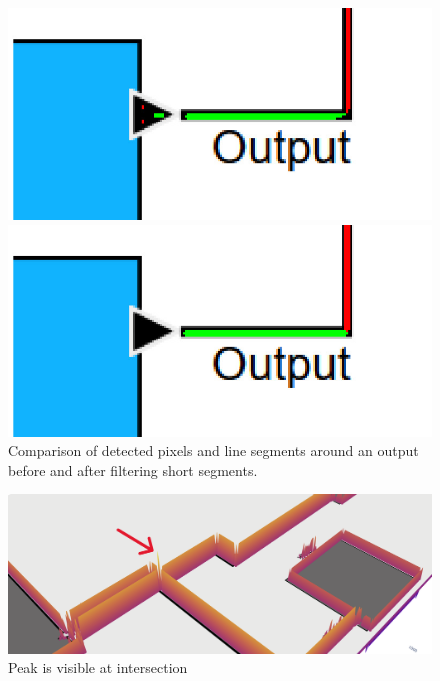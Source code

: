 \begin{figure}[h]
  \centering
  \begin{minipage}[b]{0.45\textwidth}
    \includegraphics[width=\textwidth]{Pictures/thresh_zoom.png}
  \end{minipage}
  \hfill
  \begin{minipage}[b]{0.45\textwidth}
    \includegraphics[width=\textwidth]{Pictures/line_segments_zoom.png}
  \end{minipage}
  \caption{Comparison of detected pixels and line segments around an output before and after filtering short segments.}
  \label{fig_comparison_filter}
\end{figure}
\begin{figure}
    \centering
    \includegraphics[width=1\linewidth]{Pictures/intersection_peak.png}
    \caption{Peak is visible at intersection}
    \label{fig_intersection_peak}
\end{figure}\\
